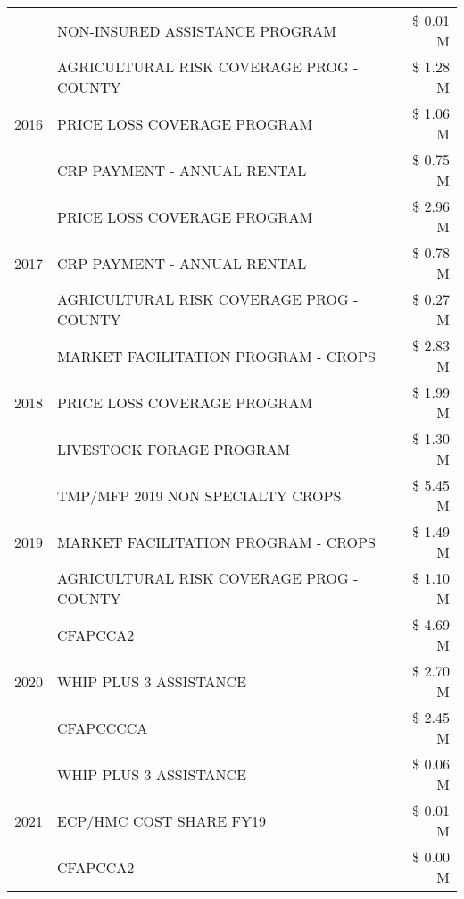 \begin{tabular}{llr}
 & NON-INSURED ASSISTANCE PROGRAM & \$ 0.01 M \\
\cline{1-3}
\multirow[t]{3}{*}{2016} & AGRICULTURAL RISK COVERAGE PROG - COUNTY & \$ 1.28 M \\
 & PRICE LOSS COVERAGE PROGRAM & \$ 1.06 M \\
 & CRP PAYMENT - ANNUAL RENTAL & \$ 0.75 M \\
\cline{1-3}
\multirow[t]{3}{*}{2017} & PRICE LOSS COVERAGE PROGRAM & \$ 2.96 M \\
 & CRP PAYMENT - ANNUAL RENTAL & \$ 0.78 M \\
 & AGRICULTURAL RISK COVERAGE PROG - COUNTY & \$ 0.27 M \\
\cline{1-3}
\multirow[t]{3}{*}{2018} & MARKET FACILITATION PROGRAM - CROPS & \$ 2.83 M \\
 & PRICE LOSS COVERAGE PROGRAM & \$ 1.99 M \\
 & LIVESTOCK FORAGE PROGRAM & \$ 1.30 M \\
\cline{1-3}
\multirow[t]{3}{*}{2019} & TMP/MFP 2019 NON SPECIALTY CROPS & \$ 5.45 M \\
 & MARKET FACILITATION PROGRAM - CROPS & \$ 1.49 M \\
 & AGRICULTURAL RISK COVERAGE PROG - COUNTY & \$ 1.10 M \\
\cline{1-3}
\multirow[t]{3}{*}{2020} & CFAPCCA2 & \$ 4.69 M \\
 & WHIP PLUS 3 ASSISTANCE & \$ 2.70 M \\
 & CFAPCCCCA & \$ 2.45 M \\
\cline{1-3}
\multirow[t]{3}{*}{2021} & WHIP PLUS 3 ASSISTANCE & \$ 0.06 M \\
 & ECP/HMC COST SHARE FY19 & \$ 0.01 M \\
 & CFAPCCA2 & \$ 0.00 M \\
\cline{1-3}
\bottomrule
\end{tabular}
